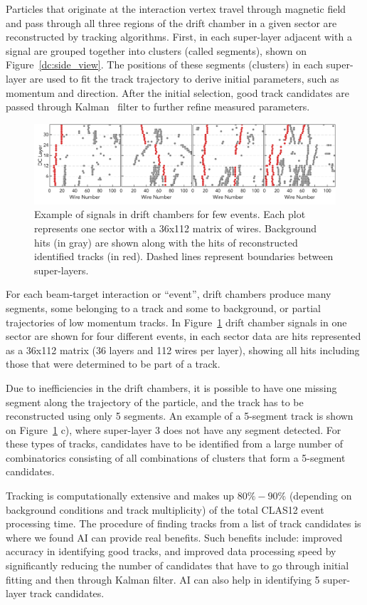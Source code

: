 Particles that originate at the interaction vertex travel through magnetic field and pass through all 
three regions of the drift chamber in a given sector are reconstructed by tracking algorithms. First, 
in each super-layer adjacent  with a signal are grouped together into clusters (called segments), 
shown on Figure~\ref{dc:side_view}. The positions of these segments (clusters) in each super-layer 
are used to fit the track trajectory to derive initial parameters, such as momentum and direction. 
After the initial selection, good track candidates are passed through Kalman~\cite{Kalman1960} 
filter to further refine measured parameters.

\begin{figure}[!ht]
\begin{center}
 \includegraphics[width=6.2in]{images/figure_dc_examples.pdf}
\caption {Example of signals in drift chambers for few events. Each plot represents one sector with 
a 36x112 matrix of wires. Background hits (in gray) are shown along with the hits of reconstructed 
identified tracks (in red). Dashed lines represent boundaries between super-layers.}
 \label{dc:events_sector}
 \end{center}
\end{figure}

For each beam-target interaction or ``event'', drift chambers produce many segments, some belonging 
to a track and some to background, or partial trajectories of low momentum tracks. In Figure~\ref{dc:events_sector} 
drift chamber signals in one sector are shown for four different  events, in each sector data are hits 
represented as a 36x112 matrix (36 layers and 112 wires per layer), showing all hits including those that 
were determined to be part of a track. 

Due to inefficiencies in the drift chambers, it is possible to have one missing segment along the trajectory 
of the particle, and the track has to be reconstructed using only 5 segments. An example of a 5-segment 
track is shown on Figure~\ref{dc:events_sector} c), where super-layer 3 does not have any segment detected. 
For these types of tracks, candidates have to be identified from a large number of combinatorics consisting 
of all combinations of clusters that form a  5-segment candidates. 

Tracking is computationally extensive and makes up $80\%-90\%$ (depending on background conditions 
and track multiplicity) of the total CLAS12 event processing time. The procedure of finding tracks from a 
list of track candidates is where we found AI can provide real benefits. Such benefits include: improved 
accuracy in identifying good tracks, and improved data processing speed by significantly reducing the 
number of candidates that have to go through initial fitting and then through Kalman filter. AI can also 
help in identifying 5 super-layer track candidates.
